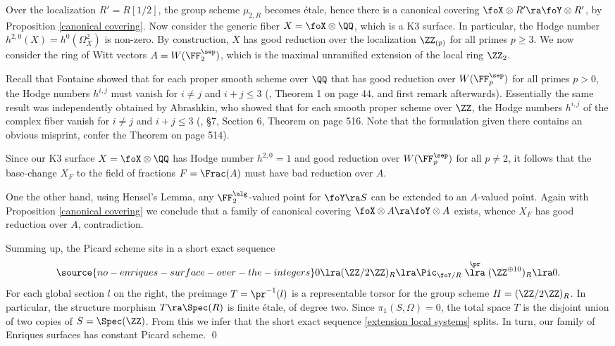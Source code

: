Over the localization $R'=R[1/2]$, the group scheme $\mu_{2,R}$ becomes \'etale, hence there is a canonical covering
$\foX\otimes R'\ra\foY\otimes R'$, by Proposition \ref{canonical covering}.
Now consider the generic fiber $X=\foX\otimes\QQ$, which is a K3 surface. In particular, the Hodge number
$h^{2,0}(X)=h^0(\Omega_X^2)$ is non-zero.
By construction, $X$ has good reduction over the localization $\ZZ_{(p)}$ for all primes $p\geq 3$.
We now consider the ring of Witt vectors
$A=W(\FF_2^\sep)$, which is the maximal unramified extension of the local ring $\ZZ_2$.

Recall that Fontaine showed that for each proper smooth scheme over $\QQ$ that has good reduction over
$W(\FF_p^\sep)$ for all primes $p>0$, the Hodge numbers $h^{i,j}$ must vanish for $i\neq j$ and $i+j\leq 3$
(\cite{Fontaine-1993}, Theorem 1 on page 44, and first remark afterwards).
Essentially the same  result was independently obtained by Abrashkin, who showed that for each smooth proper
scheme over $\ZZ$, the Hodge numbers $h^{i,j}$ of  the complex fiber vanish for $i\neq j$ and $i+j\leq 3$
(\cite{Abrashkin-1990}, \S7,  Section 6, Theorem on page 516. Note that the formulation given there contains an obvious misprint,
confer the Theorem on page 514).

Since our K3 surface $X=\foX\otimes\QQ$ has Hodge number $h^{2,0}=1$ and   good reduction over   $W(\FF_p^\sep)$ for all $p\neq 2$, it follows that
the base-change $X_F$ to the field of fractions $F=\Frac(A)$
must have bad reduction over $A$.

One the other hand, using Hensel's Lemma, any $\FF_2^\alg$-valued point for $\foY\ra S$ can be extended to an $A$-valued point.
Again with Proposition \ref{canonical covering} we conclude that a family of canonical covering  $\foX\otimes A\ra\foY\otimes A$ exists,
whence $X_F$ has good reduction over $A$, contradiction.

Summing up, the Picard scheme sits in  a short exact sequence
\begin{equation}
\label{extension local systems}
\source{no-enriques-surface-over-the-integers}
0\lra (\ZZ/2\ZZ)_R\lra \Pic_{\foY/R}\stackrel{\pr}{\lra} (\ZZ^{\oplus 10})_R\lra 0.
\end{equation}
For each global section $l$ on the right, the preimage $T=\pr^{-1}(l)$ is a representable torsor for
the group scheme $H=(\ZZ/2\ZZ)_R$. In particular, the structure morphism $T\ra \Spec(R)$ is finite
\'etale, of degree two. Since $\pi_1(S,\Omega)=0$, the total space $T$ is the disjoint union of two copies
of $S=\Spec(\ZZ)$. From this we infer that the short exact sequence \eqref{extension local systems} splits.
In turn, our family of Enriques surfaces has constant Picard scheme.
\qed


